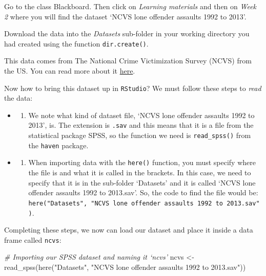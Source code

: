 \documentclass[
]{book}
\newenvironment{Shaded}{\begin{snugshade}}{\end{snugshade}}
\newcommand{\CommentTok}[1]{\textcolor[rgb]{0.56,0.35,0.01}{\textit{#1}}}
\newcommand{\FunctionTok}[1]{\textcolor[rgb]{0.00,0.00,0.00}{#1}}
\newcommand{\NormalTok}[1]{#1}
\newcommand{\OtherTok}[1]{\textcolor[rgb]{0.56,0.35,0.01}{#1}}
\newcommand{\StringTok}[1]{\textcolor[rgb]{0.31,0.60,0.02}{#1}}
\providecommand{\tightlist}{%
  \setlength{\itemsep}{0pt}\setlength{\parskip}{0pt}}
\begin{document}
Go to the class Blackboard. Then click on \emph{Learning materials} and then on \emph{Week 2} where you will find the dataset `NCVS lone offender assaults 1992 to 2013'.

Download the data into the \emph{Datasets} sub-folder in your working directory you had created using the function \texttt{dir.create()}.

This data comes from The National Crime Victimization Survey (NCVS) from the US. You can read more about it \href{https://www.bjs.gov/index.cfm?ty=dcdetail\&iid=245}{here}.

Now how to bring this dataset up in \texttt{RStudio}? We must follow these steps to \emph{read} the data:

\begin{itemize}
\item
  \begin{enumerate}
  \def\labelenumi{\arabic{enumi}.}
  \tightlist
  \item
    We note what kind of dataset file, `NCVS lone offender assaults 1992 to 2013', is. The extension is \texttt{.sav} and this means that it is a file from the statistical package SPSS, so the function we need is \texttt{read\_spss()} from the \texttt{haven} package.
  \end{enumerate}
\end{itemize}

\begin{itemize}
\item
  \begin{enumerate}
  \def\labelenumi{\arabic{enumi}.}
  \setcounter{enumi}{1}
  \tightlist
  \item
    When importing data with the \texttt{here()} function, you must specify where the file is and what it is called in the brackets. In this case, we need to specify that it is in the sub-folder `Datasets' and it is called `NCVS lone offender assaults 1992 to 2013.sav'. So, the code to find the file would be: \texttt{here("Datasets",\ "NCVS\ lone\ offender\ assaults\ 1992\ to\ 2013.sav")}.
  \end{enumerate}
\end{itemize}

Completing these steps, we now can load our dataset and place it inside a data frame called \texttt{ncvs}:

\begin{Shaded}
\begin{Highlighting}[]
\CommentTok{\# Importing our SPSS dataset and naming it ‘ncvs’ }
\NormalTok{ncvs }\OtherTok{\textless{}{-}} \FunctionTok{read\_spss}\NormalTok{(}\FunctionTok{here}\NormalTok{(}\StringTok{"Datasets"}\NormalTok{, }\StringTok{"NCVS lone offender assaults 1992 to 2013.sav"}\NormalTok{))}
\end{Highlighting}
\end{Shaded}
\end{document}
